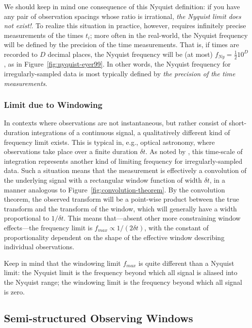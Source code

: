 \documentclass[preprint]{aastex}
\newcommand{\fig}[1]{Figure~\ref{fig:#1}}
\begin{document}
We should keep in mind one consequence of this Nyquist definition:
if you have any pair of observation spacings
whose ratio is irrational, {\it the Nyquist limit does not exist!}.
To realize this situation in practice, however, 
requires infinitely precise measurements of the
times $t_i$; more often in the real-world, the Nyquist frequency will be
defined by the precision of the time measurements.
That is, if times are recorded to $D$ decimal places, the Nyquist frequency
will be (at most) $f_{Ny} = \frac{1}{2} 10^D$, as in \fig{nyquist-eyer99}.
In other words, the Nyquist frequency for irregularly-sampled data is most
typically defined by {\it the precision of the time measurements}.

\subsubsection{Limit due to Windowing}

In contexts where observations are not instantaneous, but rather consist of
short-duration integrations of a continuous signal, a qualitatively different
kind of frequency limit exists.
This is typical in, e.g., optical astronomy, where observations take place over
a finite duration $\delta t$.
As noted by \citet{ICVG2014}, this time-scale of integration represents another
kind of limiting frequency for irregularly-sampled data.
Such a situation means that the measurement is effectively a convolution of
the underlying signal with a rectangular window function of width $\delta t$,
in a manner analogous to \fig{convolution-theorem}.
By the convolution theorem, the observed transform will be a point-wise
product between the true transform and the transform of the window, which
will generally have a width proportional to $1/\delta t$.
This means that---absent other more constraining window effects---the
frequency limit is $f_{max} \propto 1/(2\delta t)$, with the constant of
proportionality dependent on the shape of the effective window describing
individual observations.

Keep in mind that the windowing limit $f_{max}$ is quite different than a
Nyquist limit: the Nyquist limit is the frequency beyond which all signal
is aliased into the Nyquist range; the windowing limit is the frequency
beyond which all signal is zero.

\subsection{Semi-structured Observing Windows}
\end{document}
